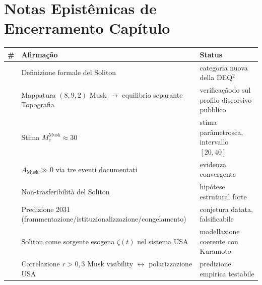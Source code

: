 \section{Notas Epistêmicas de Encerramento
Capítulo}\label{note-epistemiche-di-chiusura-capítulo}

{\def\LTcaptype{none} %
{\small\begin{longtable}[]{@{}
  >{\raggedright\arraybackslash}p{}
  >{\raggedright\arraybackslash}p{}
  >{\raggedright\arraybackslash}p{}@{}}
\toprule\noalign{}
\begin{minipage}[b]{\linewidth}\raggedright
\#
\end{minipage} & \begin{minipage}[b]{\linewidth}\raggedright
Afirmação
\end{minipage} & \begin{minipage}[b]{\linewidth}\raggedright
Status
\end{minipage} \\
\midrule\noalign{}
\endhead
\bottomrule\noalign{}
\endlastfoot
1 & Definizione formale del Soliton & \Hypoth{} categoria nuova della
DEQ$^2$ \\
2 & Mappatura \((8, 9, 2)\) Musk $\to$ equilibrio separante Topografia &
\Proved{} verificaçãodo sul profilo discorsivo pubblico \\
3 & Stima \(M_e^{\text{Musk}} \approx 30\) & \Conj{} stima parâmetrosca,
intervallo \([20, 40]\) \\
4 & \(A_{\text{Musk}} \gg 0\) via tre eventi documentati & \Proved{}
evidenza convergente \\
5 & Non-trasferibilità del Soliton & \Hypoth{} hipótese estrutural
forte \\
6 & Predizione 2031 (frammentazione/istituzionalizzazione/congelamento)
& \Conj{} conjetura datata, falsificabile \\
7 & Soliton come sorgente esogena \(\zeta(t)\) nel sistema USA &
\Hypoth{} modellazione coerente con Kuramoto \\
8 & Correlazione \(r > 0{,}3\) Musk visibility $\leftrightarrow$ polarizzazione USA &
\Conj{} predizione empirica testabile \\
\end{longtable}}
}



